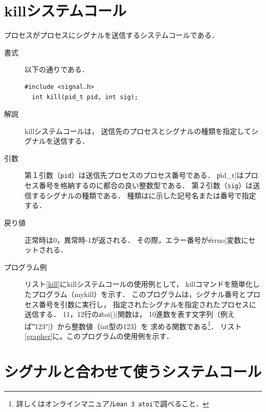 \section{killシステムコール}
プロセスがプロセスにシグナルを送信するシステムコールである．

\begin{description}
\item[書式] 以下の通りである．
\begin{lstlisting}[numbers=none]
  #include <signal.h>
  int kill(pid_t pid, int sig);
\end{lstlisting}

\item[解説]
  killシステムコールは，
  送信先のプロセスとシグナルの種類を指定してシグナルを送信する．

\item[引数]
  第１引数（\texttt{pid}）は送信先プロセスのプロセス番号である．
  \|pid_t|はプロセス番号を格納するのに都合の良い整数型である．
  第２引数（\texttt{sig}）は送信するシグナルの種類である．
  種類はに示した記号名または番号で指定する．

\item[戻り値]
  正常時は0，異常時-1が返される．
  その際，エラー番号が\|errno|変数にセットされる．

\item[プログラム例]
  リスト\ref{kill}にkillシステムコールの使用例として，
  killコマンドを簡単化したプログラム（mykill）を示す．
  このプログラムは，シグナル番号とプロセス番号を引数に実行し，
  指定されたシグナルを指定されたプロセスに送信する．
  11，12行の\|atoi()|関数は，
  10進数を表す文字列（例えば\|"123"|）から整数値（int型の123）を
  求める関数である\footnote{
    詳しくはオンラインマニュアル\texttt{man 3 atoi}で調べること．}．
  リスト\ref{grapher}に，このプログラムの使用例を示す．





\end{description}

\section{シグナルと合わせて使うシステムコール}

